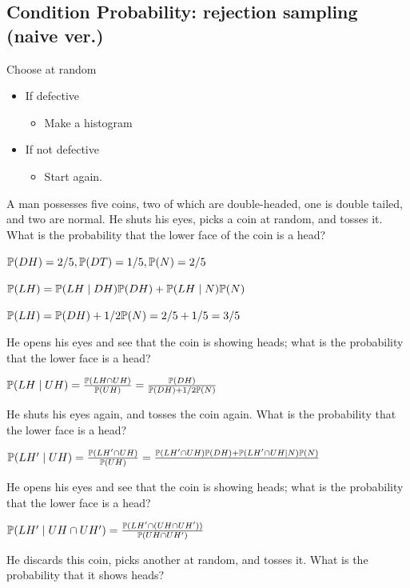 \subsection*{Condition Probability: rejection sampling (naive  ver.)}
Choose at random
\begin{itemize}
    \item If defective
    \begin{itemize}
        \item Make a histogram
    \end{itemize}
    \item If not defective
    \begin{itemize}
        \item Start again.
    \end{itemize}
\end{itemize}

\begin{example}
    A man possesses five coins, two of which are double-headed, one is double tailed, and two are normal.
    He shuts his eyes, picks a coin at random, and tosses it. What is the probability that the lower face of the coin is a head?

    $\P(DH)=2/5, \P(DT)=1/5, \P(N)=2/5$

    $\P(LH)=\P(LH \mid DH)\P(DH)+\P(LH \mid N)\P(N)$

    $\P(LH)=\P(DH)+1/2\P(N)=2/5+1/5=3/5$

    He opens his eyes and see that the coin is showing heads; what is the probability that the lower face is a head?

    $\P(LH \mid UH) = \frac{\P(LH \cap UH)}{\P(UH)}=\frac{\P(DH)}{\P(DH)+1/2\P(N)}$

    He shuts his eyes again, and tosses the coin again. What is the probability that the lower face is a head?

    $\P(LH' \mid UH)=\frac{\P(LH'\cap UH)}{\P(UH)}=\frac{\P(LH'\cap UH)\P(DH) + \P(LH'\cap UH \mid N)\P(N)}{}$

    He opens his eyes and see that the coin is showing heads; what is the probability that the lower face is a head?

    $\P(LH' \mid UH \cap UH')=\frac{\P(LH' \cap (UH \cap UH'))}{\P(UH \cap UH')}$

    He discards this coin, picks another at random, and tosses it. What is the probability that it shows heads?


\end{example}

